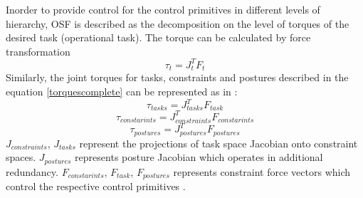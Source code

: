 %
%
Inorder to provide control for the control primitives in different levels of hierarchy, OSF is  described as the decomposition on the level of torques of the desired task (operational task). The torque can be calculated by force transformation \cite{sentis2005synthesis}
\begin{equation}
\tau_{t} = J^{T}_{t}F_{t}
\label{torque}
\end{equation}
Similarly, the joint torques for tasks, constraints and postures described in the equation \ref{torquescomplete} can be represented as in \cite{sentis2005synthesis}:
\begin{equation}
\tau_{tasks} = J_{tasks}^{T}F_{task}
\end{equation}	
\begin{equation}
\tau_{constarints} = J_{constraints}^{T}F_{constarints}
\end{equation}	
\begin{equation}
\tau_{postures} = J_{postures}^{T}F_{postures}
\end{equation}	
$J_{constraints}$, $J_{tasks}$ represent the projections of task space Jacobian onto constraint spaces. $J_{postures}$ represents posture Jacobian which operates in additional redundancy. $F_{constarints}$, $F_{task}$, $F_{postures}$ represents constraint force vectors which control the respective control primitives \cite{sentis2005synthesis}. 
